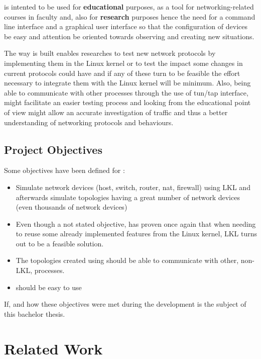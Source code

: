 \project is intented to be used for \textbf{educational} purposes, as a tool for networking-related courses in faculty and, also for \textbf{research} purposes hence the need for a command line interface and a graphical user interface so that the configuration of devices be easy and attention be oriented towards observing and creating new situations.

The way \project is built enables researches to test new network protocols by implementing them in the Linux kernel or to test the impact some changes in current protocols could have and if any of these turn to be feasible the effort necessary to integrate them with the Linux kernel will be minimum. Also, being able to communicate with other processes through the use of tun/tap interface, might facilitate an easier testing process and looking from the educational point of view might allow an accurate investigation of traffic and thus a better understanding of networking protocols and behaviours.  

\subsection{Project Objectives}
\label{sub-sec:proj-objectives}
Some objectives have been defined for \project:
\begin{itemize}
\item Simulate network devices (host, switch, router, nat, firewall) using LKL and afterwards simulate topologies having a great number of network devices (even thousands of network devices)
\item Even though a not stated objective, \project has proven once again that when needing to reuse some already implemented features from the Linux kernel, LKL turns out to be a feasible solution.
\item The topologies created using \project should be able to communicate with other, non-LKL, processes.
\item \project should be easy to use
\end{itemize}

If, and how these objectives were met during the \project development is the subject of this bachelor thesis.
\section{Related Work}
\label{sec:proj-related}

